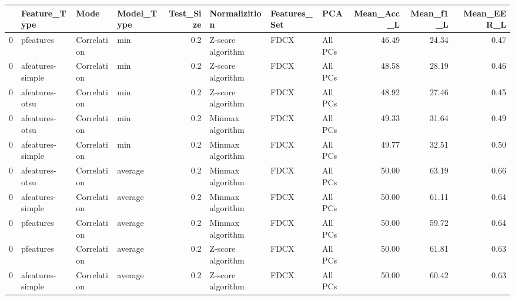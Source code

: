 \begin{tabular}{llllrlllrrr}
\toprule
{} &      Feature\_Type &         Mode & Model\_Type &  Test\_Size &      Normalizition & Features\_Set &      PCA &  Mean\_Acc\_L &  Mean\_f1\_L &  Mean\_EER\_L \\
\midrule
0 &         pfeatures &  Correlation &        min &        0.2 &  Z-score algorithm &         FDCX &  All PCs &       46.49 &      24.34 &        0.47 \\
0 &  afeatures-simple &  Correlation &        min &        0.2 &  Z-score algorithm &         FDCX &  All PCs &       48.58 &      28.19 &        0.46 \\
0 &    afeatures-otsu &  Correlation &        min &        0.2 &  Z-score algorithm &         FDCX &  All PCs &       48.92 &      27.46 &        0.45 \\
0 &    afeatures-otsu &  Correlation &        min &        0.2 &   Minmax algorithm &         FDCX &  All PCs &       49.33 &      31.64 &        0.49 \\
0 &  afeatures-simple &  Correlation &        min &        0.2 &   Minmax algorithm &         FDCX &  All PCs &       49.77 &      32.51 &        0.50 \\
0 &    afeatures-otsu &  Correlation &    average &        0.2 &   Minmax algorithm &         FDCX &  All PCs &       50.00 &      63.19 &        0.66 \\
0 &  afeatures-simple &  Correlation &    average &        0.2 &   Minmax algorithm &         FDCX &  All PCs &       50.00 &      61.11 &        0.64 \\
0 &         pfeatures &  Correlation &    average &        0.2 &   Minmax algorithm &         FDCX &  All PCs &       50.00 &      59.72 &        0.64 \\
0 &         pfeatures &  Correlation &    average &        0.2 &  Z-score algorithm &         FDCX &  All PCs &       50.00 &      61.81 &        0.63 \\
0 &  afeatures-simple &  Correlation &    average &        0.2 &  Z-score algorithm &         FDCX &  All PCs &       50.00 &      60.42 &        0.63 \\
\bottomrule
\end{tabular}
